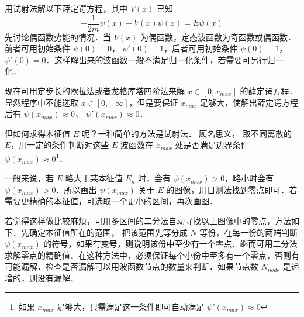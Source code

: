 用试射法解以下薛定谔方程，其中 $V(x)$ 已知
\begin{equation}
-\frac{1}{2m}\psi(x) + V(x)\psi(x) = E \psi(x)
\end{equation}
先讨论偶函数势能的情况．当 $V(x)$ 为偶函数，定态波函数为奇函数或偶函数．前者可用初始条件 $\psi(0)=0$， $\psi'(0)=1$，后者可用初始条件 $\psi(0)=1$， $\psi'(0)=0$．这样解出来的波函数一般不满足归一化条件，若需要可另行归一化．

现在可用定步长的欧拉法或者龙格库塔四阶法来解 $x\in [0, x_{max}]$ 的薛定谔方程．显然程序中不能选取 $x\in [0,+\infty]$，但是要保证 $x_{max}$ 足够大，使解出薛定谔方程后有 $\psi(x_{max})\approx 0$， $\psi'(x_{max})\approx 0$．

但如何求得本征值 $E$ 呢？一种简单的方法是试射法． 顾名思义， 取不同离散的 $E$，用一定的条件判断对这些 $E$ 波函数在 $x_{max}$ 处是否满足边界条件 $\psi(x_{max}) \approx 0$\footnote{如果 $x_{max}$ 足够大，只需满足这一条件即可自动满足 $\psi'(x_{max})\approx 0$}．

一般来说，若 $E$ 略大于某本征值 $E_n$ 时，会有 $\psi(x_{max})>0$，略小时会有 $\psi(x_{max})>0$．所以画出 $\psi(x_{max})$ 关于 $E$ 的图像，用目测法找到零点即可．若需要更精确的本征值，可选取一个更小的区间，再次画图．

若觉得这样做比较麻烦，可用多区间的二分法自动寻找以上图像中的零点，方法如下．先确定本征值所在的范围， 把该范围先等分成 $N$ 等份，在每一份的两端判断 $\psi(x_{max})$ 的符号，如果有变号，则说明该份中至少有一个零点．继而可用二分法求解零点的精确值．在这种方法中，必须保证每个小份中至多有一个零点，否则有可能漏解．检查是否漏解可以用波函数节点的数量来判断．如果节点数 $N_{node}$ 是递增的，则没有漏解．